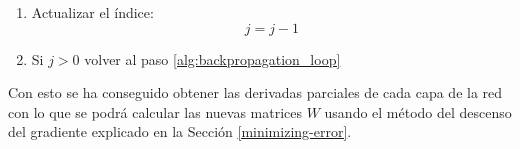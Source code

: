 \begin{enumerate}
    \item Actualizar el índice:
    \begin{equation}
    j = j-1
    \end{equation}
    
    \item Si $j>0$ volver al paso \ref{alg:backpropagation_loop}
\end{enumerate}

Con esto se ha conseguido obtener las derivadas parciales de cada capa de la red con lo que se podrá calcular las nuevas matrices $W$ usando el método del descenso del gradiente explicado en la Sección \ref{minimizing-error}.